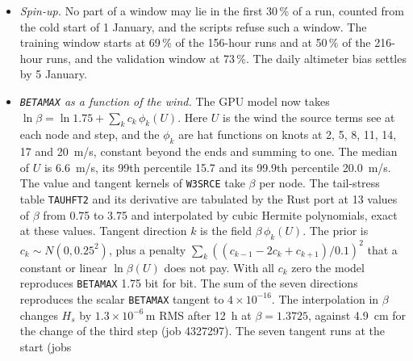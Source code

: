 \documentclass[11pt,a4paper]{article}
\begin{document}
\begin{itemize}
Morecambe Bay, Weymouth, Folkestone) where the model is 2.7 to 3.4 times
too low. Without the eight sites, the buoy $H_s$ RMSE at the start goes
from 31.25 to \SI{27.68}{cm} on the training window and from 40.79 to
\SI{38.44}{cm} on the validation window. The bias goes from $-4.77$ to
\SI{-7.48}{cm} and from $-3.03$ to \SI{-5.45}{cm}, since the model was
far too high at those sites. The representativeness errors are fitted
again without them and frozen: \SI{0.425}{m} for $H_s$ in cells at least
30\,\% land, \SI{1.10}{s} for $T_{m02}$ in cells with 0.1 to 10\,\% land,
zero elsewhere. The loss becomes a Huber loss,
$\rho(z)=z^2$ for $|z|\le1.5$ and $3|z|-2.25$ beyond, on normalised
residuals of the altimeters and the buoys, minimised by reweighted
Gauss--Newton steps. Under this cost the training cost is 35\,543 at the
start and 34\,432 at the third step, and the validation cost 50\,242 and
48\,174.
\item \emph{Spin-up.} No part of a window may lie in the first 30\,\% of
a run, counted from the cold start of 1 January, and the scripts refuse
such a window. The training window starts at 69\,\% of the 156-hour runs
and at 50\,\% of the 216-hour runs, and the validation window at 73\,\%.
The daily altimeter bias settles by 5 January.
\item \emph{\texttt{BETAMAX} as a function of the wind.} The GPU model
now takes $\ln\beta = \ln 1.75 + \sum_k c_k\,\phi_k(U)$. Here $U$ is the
wind the source terms see at each node and step, and the $\phi_k$ are hat
functions on knots at 2, 5, 8, 11, 14, 17 and \SI{20}{m/s}, constant
beyond the ends and summing to one. The median of $U$ is \SI{6.6}{m/s},
its 99th percentile 15.7 and its 99.9th percentile \SI{20.0}{m/s}. The
value and tangent kernels of \texttt{W3SRCE} take $\beta$ per node. The
tail-stress table \texttt{TAUHFT2} and its derivative are tabulated by the
Rust port at 13 values of $\beta$ from 0.75 to 3.75 and interpolated by
cubic Hermite polynomials, exact at these values. Tangent direction $k$ is
the field $\beta\,\phi_k(U)$. The prior is $c_k\sim N(0,0.25^2)$, plus a
penalty $\sum_k((c_{k-1}-2c_k+c_{k+1})/0.1)^2$ that a constant or linear
$\ln\beta(U)$ does not pay. With all $c_k$ zero the model reproduces
\texttt{BETAMAX} 1.75 bit for bit. The sum of the seven directions
reproduces the scalar \texttt{BETAMAX} tangent to $4\times10^{-16}$. The
interpolation in $\beta$ changes $H_s$ by $1.3\times10^{-6}$\,m RMS after
\SI{12}{h} at $\beta=1.3725$, against \SI{4.9}{cm} for the change of the
third step (job 4327297). The seven tangent runs at the start (jobs

\end{itemize}
\end{document}
